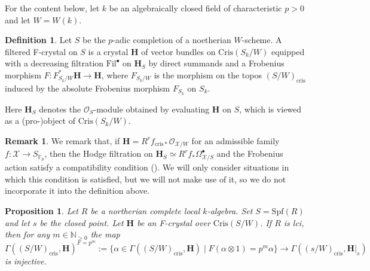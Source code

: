 \documentclass[letter, 11pt]{article}
\theoremstyle{plain}
\newtheorem{proposition}[subsubsection]{Proposition}
\theoremstyle{definition}
\newtheorem{definition}[subsubsection]{Definition}
\newtheorem{remark}[subsubsection]{Remark}
\newcommand{\IF}{\mathbb{F}}
\newcommand{\IN}{\mathbb{N}}
\newcommand\tensor{{\otimes}}
\newcommand{\<}{\langle}
\renewcommand{\>}{\rangle}
\newcommand{\sX}{\mathcal{X}}
\newcommand{\sO}{\mathcal{O}}
\newcommand{\Fil}{\mathrm{Fil}}
\newcommand{\cris}{\mathrm{cris}}
\newcommand{\Cris}{\mathrm{Cris}}
\newcommand{\bH}{\mathbf{H}}
\begin{document}
For the content below, let $k$ be an algebraically closed field of characteristic $p > 0$ and let $W = W(k)$. 

\begin{definition}
    Let $S$ be the $p$-adic completion of a noetherian $W$-scheme. A filtered F-crystal on $S$ is a crystal $\bH$ of vector bundles on $\Cris(S_k/W)$ equipped with a decreasing filtration $\Fil^\bullet$ on $\bH_S$ by direct summands and a Frobenius morphism $F : F^*_{S_k/W} \bH \to \bH$, where $F_{S_k/W}$ is the morphism on the topos $(S/W)_\cris$ induced by the absolute Frobenius morphism $F_{S_k}$ on $S_k$. 
\end{definition}

Here $\bH_S$ denotes the $\sO_S$-module obtained by evaluating $\bH$ on $S$, which is viewed as a (pro-)object of $\Cris(S_k/W)$. 

\begin{remark}
    We remark that, if $\bH = R^r f_{\cris *} \sO_{\sX/W}$ for an admissible family $f : \sX \to S_{\IF_p}$, then the Hodge filtration on $\bH_S \simeq R^r f_* \Omega^\bullet_{\sX/S}$ and the Frobenius action satisfy a compatibility condition (\cite[Thm~8.26]{BOBook}). We will only consider situations in which this condition is satisfied, but we will not make use of it, so we do not incorporate it into the definition above.
\end{remark}

\begin{proposition}
\label{prop: Frobenius trick}
    Let $R$ be a northerian complete local $k$-algebra. Set $S = \mathrm{Spf}(R)$ and let $s$ be the closed point. Let $\bH$ be an F-crystal over $\mathrm{Cris}(S/W)$. If $R$ is lci, then for any $m \in \IN_{>0}$ the map 
    \begin{equation}
    \label{eqn: restriction of Frobenius invariant}
        \Gamma((S/W)_\cris, \bH)^{F = p^m} := \{\alpha \in \Gamma((S/W)_\cris, \bH) \mid F(\alpha \tensor 1) = p^m \alpha \}  \to \Gamma((s/W)_\cris, \bH|_{s})
    \end{equation}
    is injective.
\end{proposition}
\end{document}
